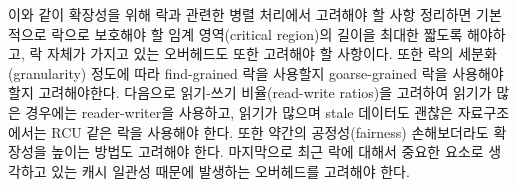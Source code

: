 





  

이와 같이 확장성을 위해 락과 관련한 병렬 처리에서 고려해야 할 사항 정리하면 
기본적으로 락으로 보호해야 할 임계 영역(critical region)의 길이을 최대한 짧도록 해야하고, 
락 자체가 가지고 있는 오버헤드도 또한 고려해야 할 사항이다. 
또한 락의 세분화(granularity) 정도에 따라 find-grained 락을 사용할지 goarse-grained 락을 사용해야 할지 
고려해야한다.
다음으로 읽기-쓰기 비율(read-write ratios)을 고려하여 읽기가 많은 경우에는 reader-writer을 사용하고,
읽기가 많으며 stale 데이터도 괜찮은 자료구조에서는 RCU 같은 락을 사용해야 한다.  
또한 약간의 공정성(fairness) 손해보더라도 확장성을 높이는 방법도 고려해야 한다.
마지막으로 최근 락에 대해서 중요한 요소로 생각하고 있는 캐시 일관성 때문에 발생하는 
오버헤드를 고려해야 한다. 

